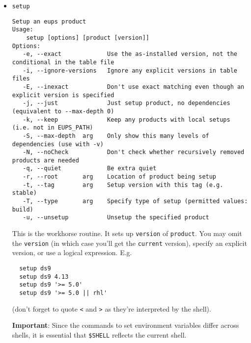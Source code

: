 \documentclass{article}
\newcommand{\code}[1]{\texttt{#1}}
\newcommand{\eups}{\code{ExtUPS}}
\begin{document}
\begin{itemize}
Go through the \eups{} databases and return every product that depends upon the specified product and version;
if the version's omitted then everything that depends on product is returned, along with the version
required. \textit{N.b.  this will be quite slow if you've disabled the cache --- it'll need to read every table
  file that \eups{} knows about.}

Unless you specify \code{--quiet} you'll be warned if a product depends on
more than one version;  this may sound unlikely but can happen if you setup
the something more than once when setting up a product.


\item \code{setup}
\begin{verbatim}
Setup an eups product
Usage:
    setup [options] [product [version]]
Options:
   -e, --exact             Use the as-installed version, not the conditional in the table file
   -i, --ignore-versions   Ignore any explicit versions in table files
   -E, --inexact           Don't use exact matching even though an explicit version is specified
   -j, --just              Just setup product, no dependencies (equivalent to --max-depth 0)
   -k, --keep              Keep any products with local setups (i.e. not in EUPS_PATH)
   -S, --max-depth  arg    Only show this many levels of dependencies (use with -v)
   -N, --noCheck           Don't check whether recursively removed products are needed
   -q, --quiet             Be extra quiet
   -r, --root       arg    Location of product being setup
   -t, --tag        arg    Setup version with this tag (e.g. stable)
   -T, --type       arg    Specify type of setup (permitted values: build)
   -u, --unsetup           Unsetup the specified product
\end{verbatim}				%

This is the workhorse routine. It sets up \code{version} of \code{product}. You
may omit the \code{version} (in which case you'll get the \code{current} version),
specify an explicit version, or use a logical expression. E.g.
\begin{verbatim}
  setup ds9
  setup ds9 4.13
  setup ds9 '>= 5.0'
  setup ds9 '>= 5.0 || rhl'
\end{verbatim}
(don't forget to quote \code{<} and \code{>} as they're interpreted by the shell).

\textbf{Important}: Since the commands to set environment variables differ across shells,
it is essential that \code{\$SHELL} reflects the current shell.


\end{itemize}
\end{document}
